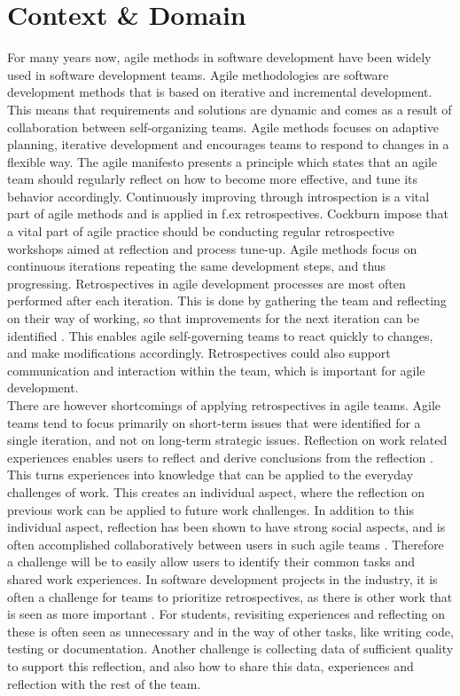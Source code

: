 \section{Context \& Domain}
For many years now, agile methods in software development have been widely used in software development teams. Agile methodologies are software development methods that is based on iterative and incremental development. This means that requirements and solutions are dynamic and comes as a result of collaboration between self-organizing teams. Agile methods focuses on adaptive planning, iterative development and encourages teams to respond to changes in a flexible way. The agile manifesto presents a principle which states that an agile team should regularly reflect on how to become more effective, and tune its behavior accordingly\citep{Beck2001}. Continuously improving through introspection is a vital part of agile methods and is applied in f.ex retrospectives\citep{Beck1999, Derby2006, Maham2008}. Cockburn impose that a vital part of agile practice should be conducting regular retrospective workshops aimed at reflection and process tune-up\citep{Cockburn2006}. Agile methods focus on continuous iterations repeating the same development steps, and thus progressing. Retrospectives in agile development processes are most often performed after each iteration. This is done by gathering the team and reflecting on their way of working, so that improvements for the next iteration can be identified \citep{Derby2006, Drury2011}. This enables agile self-governing teams to react quickly to changes, and make modifications accordingly\citep{Drury2011}. Retrospectives could also support communication and interaction within the team, which is important for agile development. \\ 
There are however shortcomings of applying retrospectives in agile teams. Agile teams tend to focus primarily on short-term issues that were identified for a single iteration, and not on long-term strategic issues\citep{Drury2011}. Reflection on work related experiences enables users to reflect and derive conclusions from the reflection \citep{Korthagen_Vasalos_2005}. This turns experiences into knowledge that can be applied to the everyday challenges of work. This creates an individual aspect, where the reflection on previous work can be applied to future work challenges. In addition to this individual aspect, reflection has been shown to have strong social aspects, and is often accomplished collaboratively between users in such agile teams \citep{Høyrup_2004}. Therefore a challenge will be to easily allow users to identify their common tasks and shared work experiences. In software development projects in the industry, it is often a challenge for teams to prioritize retrospectives, as there is other work that is seen as more important \citep{kasi2008post}. For students, revisiting experiences and reflecting on these is often seen as unnecessary and in the way of other tasks, like writing code, testing or documentation. Another challenge is collecting data of sufficient quality to support this reflection, and also how to share this data, experiences and reflection with the rest of the team.  

